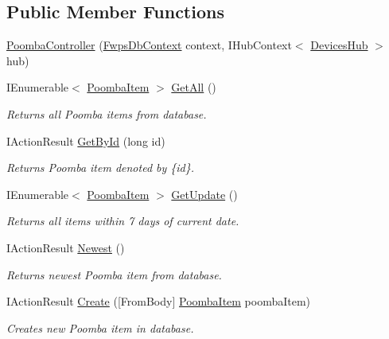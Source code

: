 \subsection*{Public Member Functions}
\begin{DoxyCompactItemize}
\item 
\mbox{\hyperlink{class_f_w_p_s_1_1_controllers_1_1_poomba_controller_a52de14a00e6ea494725efbdc2eeb2462}{Poomba\+Controller}} (\mbox{\hyperlink{class_f_w_p_s_1_1_data_1_1_fwps_db_context}{Fwps\+Db\+Context}} context, I\+Hub\+Context$<$ \mbox{\hyperlink{class_f_w_p_s_1_1_devices_hub}{Devices\+Hub}} $>$ hub)
\item 
I\+Enumerable$<$ \mbox{\hyperlink{class_f_w_p_s_1_1_models_1_1_poomba_item}{Poomba\+Item}} $>$ \mbox{\hyperlink{class_f_w_p_s_1_1_controllers_1_1_poomba_controller_ae19ff49329ce6d7e134336fe61691370}{Get\+All}} ()
\begin{DoxyCompactList}\small\item\em Returns all Poomba items from database. \end{DoxyCompactList}\item 
I\+Action\+Result \mbox{\hyperlink{class_f_w_p_s_1_1_controllers_1_1_poomba_controller_a8974ce80e3e49cdbc98d58135e7b3780}{Get\+By\+Id}} (long id)
\begin{DoxyCompactList}\small\item\em Returns Poomba item denoted by \{id\}. \end{DoxyCompactList}\item 
I\+Enumerable$<$ \mbox{\hyperlink{class_f_w_p_s_1_1_models_1_1_poomba_item}{Poomba\+Item}} $>$ \mbox{\hyperlink{class_f_w_p_s_1_1_controllers_1_1_poomba_controller_adfc9eb5cb3b835aa5dcba35d982f5612}{Get\+Update}} ()
\begin{DoxyCompactList}\small\item\em Returns all items within 7 days of current date. \end{DoxyCompactList}\item 
I\+Action\+Result \mbox{\hyperlink{class_f_w_p_s_1_1_controllers_1_1_poomba_controller_a68095b381a0c0b2828afe9d401855bdb}{Newest}} ()
\begin{DoxyCompactList}\small\item\em Returns newest Poomba item from database. \end{DoxyCompactList}\item 
I\+Action\+Result \mbox{\hyperlink{class_f_w_p_s_1_1_controllers_1_1_poomba_controller_afb34ea874e3d77cf6e3db3b2263f32f9}{Create}} (\mbox{[}From\+Body\mbox{]} \mbox{\hyperlink{class_f_w_p_s_1_1_models_1_1_poomba_item}{Poomba\+Item}} poomba\+Item)
\begin{DoxyCompactList}\small\item\em Creates new Poomba item in database. \end{DoxyCompactList}\end{DoxyCompactItemize}

